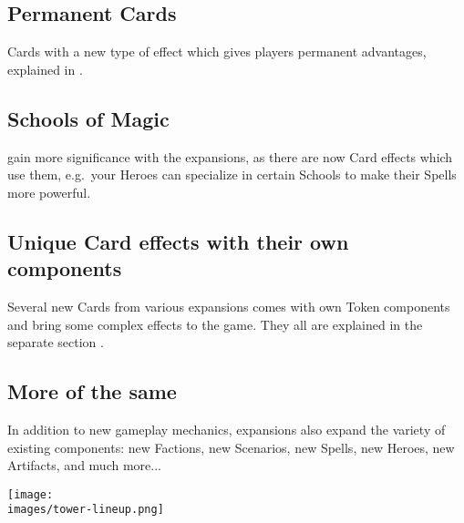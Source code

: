 \begin{multicols*}{2}
\subsection*{Permanent Cards}
Cards with a new type of effect which gives players permanent advantages, explained in .

\subsection*{Schools of Magic}
 gain more significance with the expansions, as there are now Card effects which use them, e.g.~your Heroes can specialize in certain Schools to make their Spells more powerful.

\subsection*{Unique Card effects with their own components}
Several new Cards from various expansions comes with own Token components and bring some complex effects to the game.
They all are explained in the separate section .

\subsection*{More of the same}
In addition to new gameplay mechanics, expansions also expand the variety of existing components: new Factions, new Scenarios, new Spells, new Heroes, new Artifacts, and much more...

\begin{center}
    \texttt{[image: \\images/tower-lineup.png]}
\end{center}
\vspace*{\fill}
\end{multicols*}
\pagebreak

